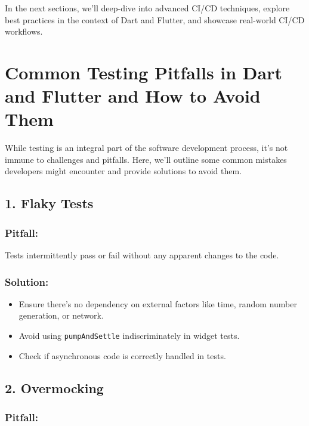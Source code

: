 \documentclass[
]{article}
\providecommand{\tightlist}{%
  \setlength{\itemsep}{0pt}\setlength{\parskip}{0pt}}
\begin{document}
In the next sections, we'll deep-dive into advanced CI/CD techniques,
explore best practices in the context of Dart and Flutter, and showcase
real-world CI/CD workflows.

\section{Common Testing Pitfalls in Dart and Flutter and How to Avoid
Them}\label{common-testing-pitfalls-in-dart-and-flutter-and-how-to-avoid-them}

While testing is an integral part of the software development process,
it's not immune to challenges and pitfalls. Here, we'll outline some
common mistakes developers might encounter and provide solutions to
avoid them.

\subsection{1. Flaky Tests}\label{flaky-tests}

\subsubsection{Pitfall:}\label{pitfall}

Tests intermittently pass or fail without any apparent changes to the
code.

\subsubsection{Solution:}\label{solution}

\begin{itemize}
\tightlist
\item
  Ensure there's no dependency on external factors like time, random
  number generation, or network.
\item
  Avoid using \texttt{pumpAndSettle} indiscriminately in widget tests.
\item
  Check if asynchronous code is correctly handled in tests.
\end{itemize}

\subsection{2. Overmocking}\label{overmocking}

\subsubsection{Pitfall:}\label{pitfall-1}
\end{document}
